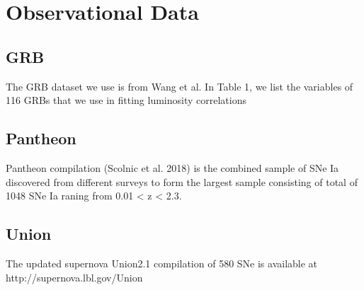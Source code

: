 \section{Observational Data}
\subsection{GRB}
The GRB dataset we use is from Wang et al. In Table 1, we list the variables of 116 GRBs that we use in fitting luminosity correlations
\subsection{Pantheon}
Pantheon compilation (Scolnic et al. 2018) is the combined sample of SNe Ia discovered from different surveys to form the largest sample consisting of total of 1048 SNe Ia raning from 0.01 < z < 2.3.
\subsection{Union}
The updated supernova Union2.1 compilation of 580 SNe is available at http://supernova.lbl.gov/Union
